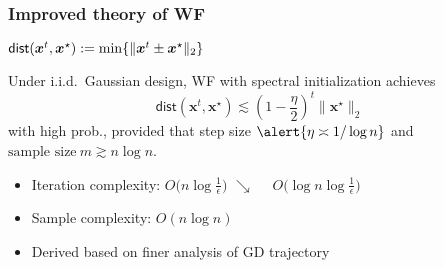 \documentclass[compress,
mathserif,wide,%
]{beamer}
\begin{document}
\begin{frame}
	\frametitle{Improved theory of WF}


\hfill $\mathsf{dist}(\bm{x}^t, \bm{x}^{\star}) := \min \{ \| \bm{x}^t \pm \bm{x}^{\star} \|_2 \}$


\begin{theorem}
Under i.i.d.~Gaussian design, WF with spectral initialization achieves 
	$$ \mathsf{dist}( \bm{x}^{t}, \bm{x}^\star ) \lesssim \left(1-\frac{\eta}{2}\right)^{t} \|\bm{x}^\star\|_{2}$$
with high prob., 
provided that step size $\alert{\eta \asymp 1 / \log n}$ and
$ \text{sample size}~ m \gtrsim n \log n $.
\end{theorem}


\begin{itemize}
  \itemsep0.5em
  \item Iteration complexity:  $O\big(n \log\frac{1}{\epsilon}\big)$   $\searrow$~~  \alert{$O\big( \log n \log\frac{1}{\epsilon} \big)$}
  \item Sample complexity: $O(n\log n)$
  \item Derived based on finer analysis of GD trajectory
\end{itemize}

\end{frame}
\end{document}
